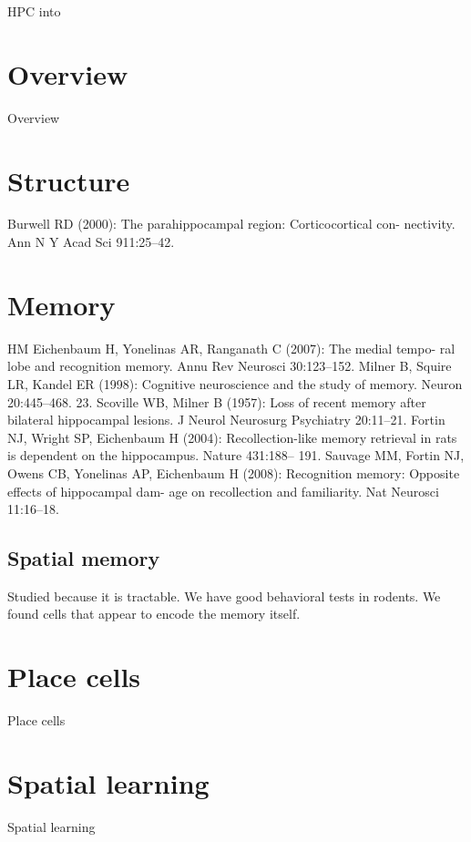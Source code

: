 HPC into

\section{Overview}
Overview

\section{Structure}
Burwell RD (2000): The parahippocampal region: Corticocortical con- nectivity. Ann N Y Acad Sci 911:25–42.

\section{Memory}
HM
Eichenbaum H, Yonelinas AR, Ranganath C (2007): The medial tempo- ral lobe and recognition memory. Annu Rev Neurosci 30:123–152.
Milner B, Squire LR, Kandel ER (1998): Cognitive neuroscience and the study of memory. Neuron 20:445–468.
23.
Scoville WB, Milner B (1957): Loss of recent memory after bilateral hippocampal lesions. J Neurol Neurosurg Psychiatry 20:11–21.
Fortin NJ, Wright SP, Eichenbaum H (2004): Recollection-like memory retrieval in rats is dependent on the hippocampus. Nature 431:188– 191.
Sauvage MM, Fortin NJ, Owens CB, Yonelinas AP, Eichenbaum H (2008): Recognition memory: Opposite effects of hippocampal dam- age on recollection and familiarity. Nat Neurosci 11:16–18.

\subsection{Spatial memory}\label{sec:intro:HPC:spatial}
Studied because it is tractable.
We have good behavioral tests in rodents.
We found cells that appear to encode the memory itself.

\section{Place cells}
Place cells

\section{Spatial learning}
Spatial learning